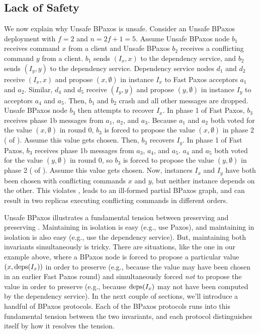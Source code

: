\subsection{Lack of Safety}
We now explain why Unsafe BPaxos is unsafe. Consider an Unsafe BPaxos
deployment with $f = 2$ and $n = 2f + 1 = 5$.
%
Assume Unsafe BPaxos node $b_1$ receives command $x$ from a client and
Unsafe BPaxos $b_2$ receives a conflicting command $y$ from a client. $b_1$
sends $(I_x, x)$ to the dependency service, and $b_2$ sends $(I_y, y)$ to the
dependency service. Dependency service nodes $d_1$ and $d_2$ receive $(I_x, x)$
and propose $(x, \emptyset)$ in instance $I_x$ to Fast Paxos acceptors $a_1$
and $a_2$. Similar, $d_4$ and $d_5$ receive $(I_y, y)$ and propose $(y,
\emptyset)$ in instance $I_y$ to acceptors $a_4$ and $a_5$. Then, $b_1$ and
$b_2$ crash and all other messages are dropped. Unsafe BPaxos node $b_3$
then attempts to recover $I_x$. In phase 1 of Fast Paxos, $b_3$ receives phase
1b messages from $a_1$, $a_2$, and $a_3$. Because $a_1$ and $a_2$ both voted
for the value $(x, \emptyset{})$ in round $0$, $b_3$ is forced to propose the
value $(x, \emptyset)$ in phase 2 ( of
). Assume this value gets chosen. Then, $b_3$ recovers
$I_y$. In phase 1 of Fast Paxos, $b_3$ receives phase 1b messages from $a_3$,
$a_4$, and $a_5$. $a_4$ and $a_5$ both voted for the value $(y, \emptyset{})$
in round $0$, so $b_3$ is forced to propose the value $(y, \emptyset)$ in phase
2 ( of ). Assume this value gets
chosen. Now, instances $I_x$ and $I_y$ have both been chosen with conflicting
commands $x$ and $y$, but neither instance depends on the other. This violates
, leads to an ill-formed partial BPaxos graph, and
can result in two replicas executing conflicting commands in different orders.

Unsafe BPaxos illustrates a fundamental tension between preserving
 and preserving .
Maintaining  in isolation is easy (e.g., use Paxos),
and maintaining  in isolation is also easy (e.g., use
the dependency service). But, maintaining both invariants simultaneously is
tricky. There are situations, like the one in our example above, where a BPaxos
node is forced to propose a particular value $(x, \text{deps}(I_x))$ in order to
preserve  (e.g., because the value may have been
chosen in an earlier Fast Paxos round) and simultaneously forced \emph{not} to
propose the value in order to preserve  (e.g.,
because $\text{deps}(I_x)$ may not have been computed by the dependency service).
%
In the next couple of sections, we'll introduce a handful of BPaxos protocols.
Each of the BPaxos protocols runs into this fundamental tension between the two
invariants, and each protocol distinguishes itself by how it resolves the
tension.
